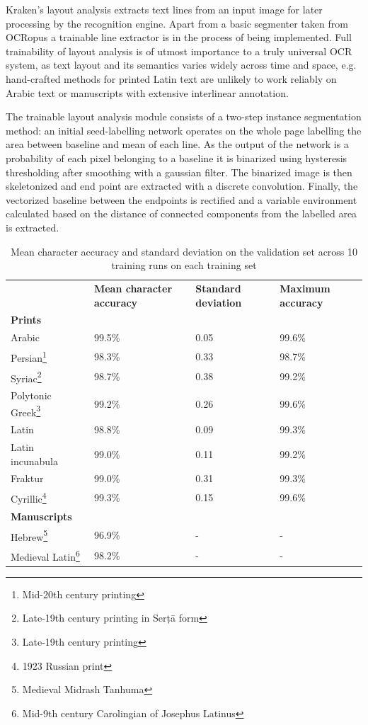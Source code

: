 Kraken's layout analysis extracts text lines from an input image for later
processing by the recognition engine. Apart from a basic segmenter taken from
OCRopus a trainable line extractor is in the process of being implemented. Full
trainability of layout analysis is of utmost importance to a truly universal
OCR system, as text layout and its semantics varies widely across time and
space, e.g. hand-crafted methods for printed Latin text are unlikely to work
reliably on Arabic text or manuscripts with extensive interlinear annotation.

The trainable layout analysis module consists of a two-step instance
segmentation method: an initial seed-labelling network operates on the whole
page labelling the area between baseline and mean of each line. As the output
of the network is a probability of each pixel belonging to a baseline it is
binarized using hysteresis thresholding after smoothing with a gaussian filter.
The binarized image is then skeletonized and end point are extracted with a
discrete convolution. Finally, the vectorized baseline between the endpoints is
rectified and a variable environment calculated based on the distance of
connected components from the labelled area is extracted.

\begin{table}[h]
\centering
\begin{minipage}{\textwidth}
\caption{Mean character accuracy and standard deviation on the validation set
	across 10 training runs on each training set}
\label{tab:kraken_acc}
\renewcommand\footnoterule{}
\begin{tabularx}{\textwidth}{lXXX} \toprule
& \textbf{Mean character accuracy} & \textbf{Standard deviation} & \textbf{Maximum accuracy}\\
\addlinespace
\textbf{Prints}\ \\ \midrule
Arabic~\cite{kiessling2017important} & 99.5\% & 0.05 & 99.6\%\\
Persian\footnote{Mid-20th century printing} & 98.3\% & 0.33 & 98.7\%\\
Syriac\footnote{Late-19th century printing in Serṭā form}& 98.7\% & 0.38 & 99.2\%\\
Polytonic Greek\footnote{Late-19th century printing}& 99.2\% & 0.26 & 99.6\%\\
Latin~\cite{springmann2018ground} & 98.8\% & 0.09 & 99.3\%\\
Latin incunabula~\cite{springmann2018ground} & 99.0\% & 0.11 & 99.2\%\\
Fraktur~\cite{springmann2018ground} & 99.0\% & 0.31 & 99.3\%\\
Cyrillic\footnote{1923 Russian print}& 99.3\% & 0.15 & 99.6\%\\
\addlinespace
\textbf{Manuscripts}\ \\ \midrule
Hebrew\footnote{Medieval Midrash Tanhuma}& 96.9\% & - & -\\
Medieval Latin\footnote{Mid-9th century Carolingian of Josephus Latinus} & 98.2\% & -  & -\\
\bottomrule
\end{tabularx}
\end{minipage}
\end{table}


